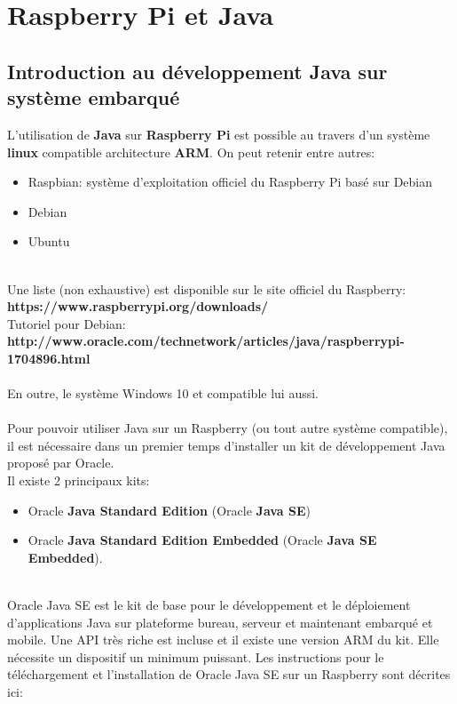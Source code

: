 \documentclass{article}
\begin{document}
\section*{Raspberry Pi et Java}

\subsection*{Introduction au développement Java sur système embarqué}
L’utilisation de \textbf{Java} sur \textbf{Raspberry Pi} est possible au travers d’un système \textbf{linux} compatible architecture \textbf{ARM}. On peut retenir entre autres:
\begin{itemize}
\item Raspbian: système d’exploitation officiel du Raspberry Pi basé sur Debian
\item Debian
\item Ubuntu
\end{itemize}
\\
Une liste (non exhaustive) est disponible sur le site officiel du Raspberry:\\
\textbf{https://www.raspberrypi.org/downloads/}
\\
Tutoriel pour Debian:\\
\textbf{http://www.oracle.com/technetwork/articles/java/raspberrypi-1704896.html}
\\
\\
En outre, le système Windows 10 et compatible lui aussi.
\\
\\
Pour pouvoir utiliser Java sur un Raspberry (ou tout autre système compatible), il est nécessaire dans un premier temps d’installer un kit de développement Java proposé par Oracle. \\
Il existe 2 principaux kits:
\begin{itemize}
\item Oracle \textbf{Java Standard Edition} (Oracle \textbf{Java SE})
\item Oracle \textbf{Java Standard Edition Embedded} (Oracle \textbf{Java SE Embedded}).
\end{itemize}
\\
Oracle Java SE est le kit de base pour le développement et le déploiement d’applications Java sur plateforme bureau, serveur et maintenant embarqué et mobile. Une API très riche est incluse et il existe une version ARM du kit. Elle nécessite un dispositif un minimum puissant.
Les instructions pour le téléchargement et l’installation de Oracle Java SE sur un Raspberry sont décrites ici:\\
\end{document}
